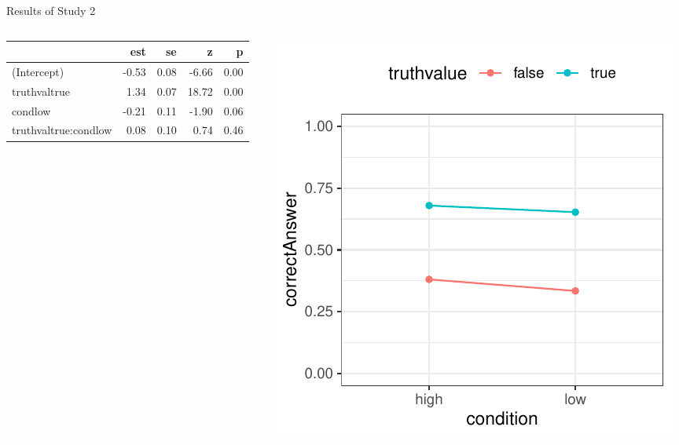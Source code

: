 \documentclass[aspectratio=169]{beamer}
\begin{document}
\begin{frame}{Results of Study 2}
  \begin{columns}
    \begin{column}[c]{.5\textwidth}
      {\footnotesize
      \begin{tabular}{@{}lrrrr@{}}
  \hline
 & est & se & z & p \\ 
  \hline
(Intercept) & -0.53 & 0.08 & -6.66 & 0.00 \\ 
  truthvaltrue & 1.34 & 0.07 & 18.72 & 0.00 \\ 
  condlow & -0.21 & 0.11 & -1.90 & 0.06 \\ 
  truthvaltrue:condlow & 0.08 & 0.10 & 0.74 & 0.46 \\ 
   \hline
\end{tabular}
      }
    \end{column}
    \begin{column}[c]{.5\textwidth}
      \includegraphics[scale = .8]{../figures/study2}
    \end{column}
  \end{columns}
\end{frame}
\end{document}
